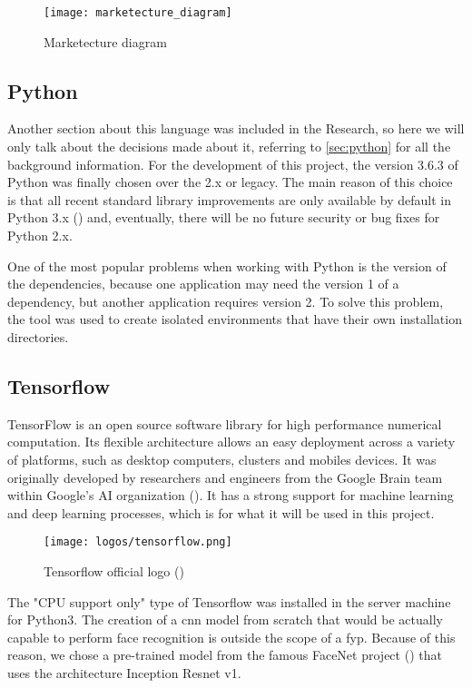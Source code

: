 \begin{figure}[!ht]
	\centering
	\texttt{[image: marketecture\_diagram]}
	\caption{Marketecture diagram}
	\label{fig:marketecture_diagram}
\end{figure}	

	\subsection{Python}
	Another section about this language was included in the Research, so here we will only talk about the decisions made about it, referring to \ref{sec:python} for all the background information. For the development of this project, the version 3.6.3 of Python was finally chosen over the 2.x or legacy. The main reason of this choice is that all recent standard library improvements are only available by default in Python 3.x (\cite{python_2or3}) and, eventually, there will be no future security or bug fixes for Python 2.x.

	One of the most popular problems when working with Python is the version of the dependencies, because one application may need the version 1 of a dependency, but another application requires version 2. To solve this problem, the \cite{virtualenv} tool was used to create isolated environments that have their own installation directories.  

	\subsection{Tensorflow}
	TensorFlow is an open source software library for high performance numerical computation. Its flexible architecture allows an easy deployment across a variety of platforms, such as desktop computers, clusters and mobiles devices. It was originally developed by researchers and engineers from the Google Brain team within Google’s AI organization (\cite{tensorflow_main_website}). It has a strong support for machine learning and deep learning processes, which is for what it will be used in this project. 

	\begin{figure}[!ht]
		\centering
		\texttt{[image: logos/tensorflow.png]}
		\caption{Tensorflow official logo (\cite{tensorflow_main_website})}
		\label{fig:tensorflow}
	\end{figure}

	The "CPU support only" type of Tensorflow was installed in the server machine for Python3. The creation of a \gls{cnn} model from scratch that would be actually capable to perform face recognition is outside the scope of a \gls{fyp}. Because of this reason, we chose a pre-trained model from the famous FaceNet project (\cite{facenet_article}) that uses the architecture Inception Resnet v1.

